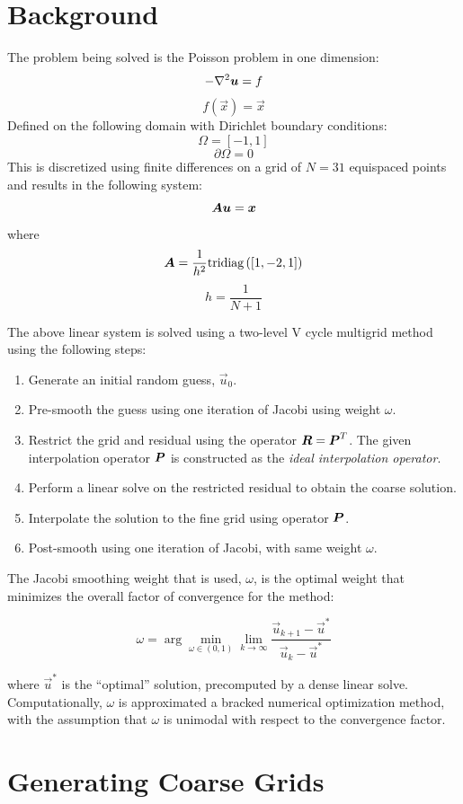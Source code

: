 


\section{Background}
The problem being solved is the Poisson problem in one dimension:
$$ -\nabla^2\bm{{u}} = f $$
$$ f(\vec{x}) = \vec{x} $$
Defined on the following domain with Dirichlet boundary conditions:
$$ \Omega = \left[-1, 1\right]$$
$$ \partial\Omega = 0 $$
This is discretized using finite differences on a grid of $N=31$ equispaced points and results in the following system:
$$ \bm{{A}}\bm{{u}} = \bm{{x}} $$
where
$$\bm{{A}} = \frac{1}{h^2} \text{tridiag}\left(\left[1, -2, 1\right]\right)$$
$$h = \frac{1}{N+1}$$

The above linear system is solved using a two-level V cycle multigrid method using the following steps:

\begin{enumerate}
\item Generate an initial random guess, $\vec{u}_0$.
\item Pre-smooth the guess using one iteration of Jacobi using weight $\omega$.
\item Restrict the grid and residual using the operator $\bm{{R}}=\bm{{P}}^T$.  The given interpolation operator $\bm{{P}}$ is constructed as the \textit{ideal interpolation operator}.
\item Perform a linear solve on the restricted residual to obtain the coarse solution.
\item Interpolate the solution to the fine grid using operator $\bm{{P}}$.
\item Post-smooth using one iteration of Jacobi, with same weight $\omega$.
\end{enumerate}

The Jacobi smoothing weight that is used, $\omega$, is the optimal weight that minimizes the overall factor of convergence for the method:

$$\omega = \arg \min_{\omega\in\left(0,1\right)} \lim_{k\to\infty} \frac{ \vec{u}_{k+1} - \vec{u}^* }{ \vec{u}_{k} - \vec{u}^* }$$

where $\vec{u}^*$ is the ``optimal'' solution, precomputed by a dense linear solve.  Computationally, $\omega$ is approximated a bracked numerical optimization method, with the assumption that $\omega$ is unimodal with respect to the convergence factor.

\section{Generating Coarse Grids}

